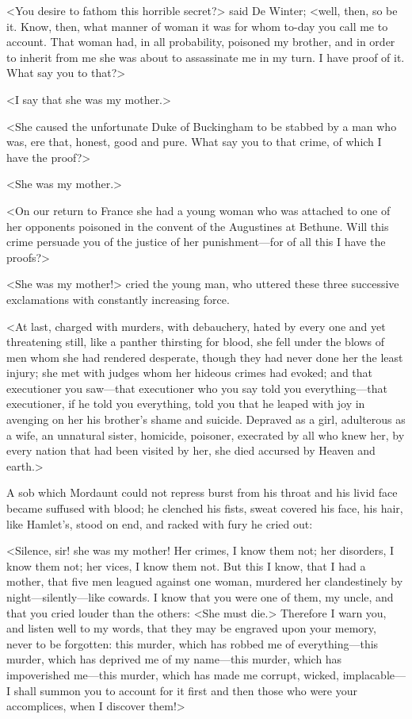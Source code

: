 <You desire to fathom this horrible secret?> said De Winter; <well, then, so be it. Know, then, what manner of woman it was for whom to-day you call me to account. That woman had, in all probability, poisoned my brother, and in order to inherit from me she was about to assassinate me in my turn. I have proof of it. What say you to that?>

<I say that she was my mother.>

<She caused the unfortunate Duke of Buckingham to be stabbed by a man who was, ere that, honest, good and pure. What say you to that crime, of which I have the proof?>

<She was my mother.>

<On our return to France she had a young woman who was attached to one of her opponents poisoned in the convent of the Augustines at Bethune. Will this crime persuade you of the justice of her punishment—for of all this I have the proofs?>

<She was my mother!> cried the young man, who uttered these three successive exclamations with constantly increasing force.

<At last, charged with murders, with debauchery, hated by every one and yet threatening still, like a panther thirsting for blood, she fell under the blows of men whom she had rendered desperate, though they had never done her the least injury; she met with judges whom her hideous crimes had evoked; and that executioner you saw—that executioner who you say told you everything—that executioner, if he told you everything, told you that he leaped with joy in avenging on her his brother's shame and suicide. Depraved as a girl, adulterous as a wife, an unnatural sister, homicide, poisoner, execrated by all who knew her, by every nation that had been visited by her, she died accursed by Heaven and earth.>

A sob which Mordaunt could not repress burst from his throat and his livid face became suffused with blood; he clenched his fists, sweat covered his face, his hair, like Hamlet's, stood on end, and racked with fury he cried out:

<Silence, sir! she was my mother! Her crimes, I know them not; her disorders, I know them not; her vices, I know them not. But this I know, that I had a mother, that five men leagued against one woman, murdered her clandestinely by night—silently—like cowards. I know that you were one of them, my uncle, and that you cried louder than the others: <She must die.> Therefore I warn you, and listen well to my words, that they may be engraved upon your memory, never to be forgotten: this murder, which has robbed me of everything—this murder, which has deprived me of my name—this murder, which has impoverished me—this murder, which has made me corrupt, wicked, implacable—I shall summon you to account for it first and then those who were your accomplices, when I discover them!>

